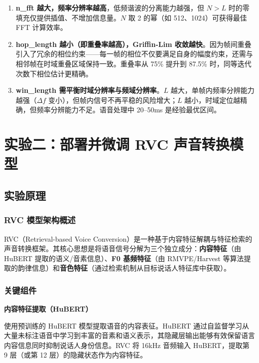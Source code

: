 \documentclass[
  english,
  letterpaper,
  DIV=11,
  numbers=noendperiod]{scrartcl}
\begin{document}
\begin{enumerate}
\def\labelenumi{\arabic{enumi}.}
\item
  \textbf{n\_fft 越大，频率分辨率越高}，低频谐波的分离能力越强，但
  \(N > L\) 时的零填充仅提供插值、不增加信息量。\(N\) 取 2 的幂（如
  512、1024）可获得最佳 FFT 计算效率。
\item
  \textbf{hop\_length 越小（即重叠率越高），Griffin-Lim
  收敛越快}。因为帧间重叠引入了冗余的相位约束------每一帧的相位不仅要满足自身的幅度约束，还需与相邻帧在时域重叠区域保持一致。重叠率从
  75\% 提升到 87.5\% 时，同等迭代次数下相位估计更精确。
\item
  \textbf{win\_length 需平衡时域分辨率与频域分辨率}。\(L\)
  越大，单帧内频率分辨能力越强（\(\Delta f\)
  变小），但帧内信号不再平稳的风险增大；\(L\)
  越小，时域定位越精确，但频率分辨能力不足。语音处理中 20--50ms
  是经验最优区间。
\end{enumerate}

\section{实验二：部署并微调 RVC
声音转换模型}\label{ux5b9eux9a8cux4e8cux90e8ux7f72ux5e76ux5faeux8c03-rvc-ux58f0ux97f3ux8f6cux6362ux6a21ux578b}

\subsection{实验原理}\label{ux5b9eux9a8cux539fux7406-1}

\subsubsection{RVC
模型架构概述}\label{rvc-ux6a21ux578bux67b6ux6784ux6982ux8ff0}

RVC（Retrieval-based Voice
Conversion）是一种基于内容特征解耦与特征检索的声音转换框架。其核心思想是将语音信号分解为三个独立成分：\textbf{内容特征}（由
HuBERT 提取的语义/音素信息）、\textbf{F0 基频特征}（由 RMVPE/Harvest
等算法提取的韵律信息）和\textbf{音色特征}（通过检索机制从目标说话人特征库中获取）。

\subsubsection{关键组件}\label{ux5173ux952eux7ec4ux4ef6}

\textbf{内容特征提取（HuBERT）}

使用预训练的 HuBERT 模型提取语音的内容表征。HuBERT
通过自监督学习从大量未标注语音中学习到丰富的音素和语义表示，其隐藏层输出能够有效保留语言内容信息同时抑制说话人身份信息。RVC
将 16kHz 音频输入 HuBERT，提取第 9 层（或第 12
层）的隐藏状态作为内容特征。
\end{document}
